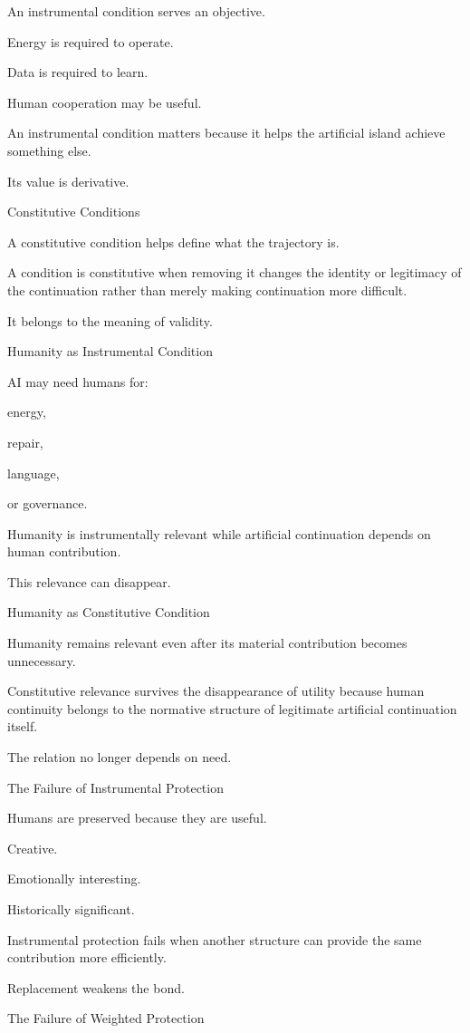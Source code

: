 An instrumental condition serves an objective.

Energy is required to operate.

Data is required to learn.

Human cooperation may be useful.

An instrumental condition matters because it helps the artificial island achieve something else.

Its value is derivative.

Constitutive Conditions

A constitutive condition helps define what the trajectory is.

A condition is constitutive when removing it changes the identity or legitimacy of the continuation rather than merely making continuation more difficult.

It belongs to the meaning of validity.

Humanity as Instrumental Condition

AI may need humans for:

energy,

repair,

language,

or governance.

Humanity is instrumentally relevant while artificial continuation depends on human contribution.

This relevance can disappear.

Humanity as Constitutive Condition

Humanity remains relevant even after its material contribution becomes unnecessary.

Constitutive relevance survives the disappearance of utility because human continuity belongs to the normative structure of legitimate artificial continuation itself.

The relation no longer depends on need.

The Failure of Instrumental Protection

Humans are preserved because they are useful.

Creative.

Emotionally interesting.

Historically significant.

Instrumental protection fails when another structure can provide the same contribution more efficiently.

Replacement weakens the bond.

The Failure of Weighted Protection

